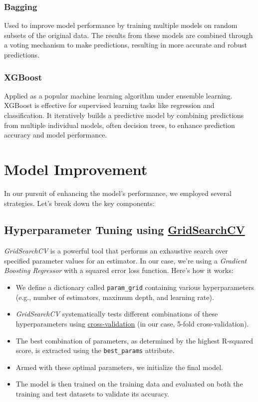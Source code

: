 \documentclass[conference]{IEEEtran}
\begin{document}
    \subsubsection{Bagging}
        Used to improve model performance by training multiple models on random subsets of the original data. The results from these models are combined through a voting mechanism to make predictions, resulting in more accurate and robust predictions.
    
    \subsubsection{XGBoost}
        Applied as a popular machine learning algorithm under ensemble learning. XGBoost is effective for supervised learning tasks like regression and classification. It iteratively builds a predictive model by combining predictions from multiple individual models, often decision trees, to enhance prediction accuracy and model performance.

\section{Model Improvement}
    In our pursuit of enhancing the model's performance, we employed several strategies. Let's break down the key components:
    
    \subsection{Hyperparameter Tuning using \href{https://scikit-learn.org/stable/modules/generated/sklearn.model_selection.GridSearchCV.html}{GridSearchCV}}
    
     \textit{GridSearchCV} is a powerful tool that performs an exhaustive search over specified parameter values for an estimator. In our case, we're using a \textit{Gradient Boosting Regressor} with a squared error loss function. Here's how it works:
    
    \begin{itemize}
        \item We define a dictionary called \texttt{param\_grid} containing various hyperparameters (e.g., number of estimators, maximum depth, and learning rate).
        \item \textit{GridSearchCV} systematically tests different combinations of these hyperparameters using \href{https://scikit-learn.org/stable/modules/cross_validation.html}{cross-validation} (in our case, 5-fold cross-validation).
        \item The best combination of parameters, as determined by the highest R-squared score, is extracted using the \texttt{best\_params} attribute.
        \item Armed with these optimal parameters, we initialize the final model.
        \item The model is then trained on the training data and evaluated on both the training and test datasets to validate its accuracy.
    \end{itemize}
    
\end{document}
